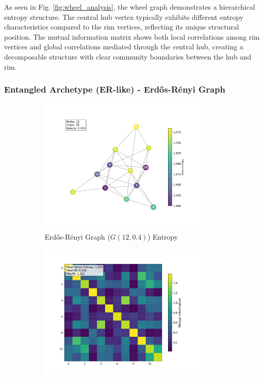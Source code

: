 \documentclass[12pt, letterpaper]{article}
\begin{document}
As seen in Fig. \ref{fig:wheel_analysis}, the wheel graph demonstrates a hierarchical entropy structure. The central hub vertex typically exhibits different entropy characteristics compared to the rim vertices, reflecting its unique structural position. The mutual information matrix shows both local correlations among rim vertices and global correlations mediated through the central hub, creating a decomposable structure with clear community boundaries between the hub and rim.

\subsubsection{Entangled Archetype (ER-like) - Erdős-Rényi Graph}

\begin{figure}[H]
    \centering
    \begin{subfigure}[b]{0.48\textwidth}
        \includegraphics[width=0.9\textwidth]{images/Graph Visualizations/Entangled/Erdos_Renyi_Vertex_Entropy.png}
        \caption{Erdős-Rényi Graph ($G(12,0.4)$) Entropy}
        \label{fig:erdos_entropy}
    \end{subfigure}
    \hfill
    \begin{subfigure}[b]{0.48\textwidth}
        \includegraphics[width=0.9\textwidth]{images/Graph Visualizations/Entangled/Erdos_Renyi_Vertex_MI_Matrix.png}

\end{subfigure}
\end{figure}
\end{document}
